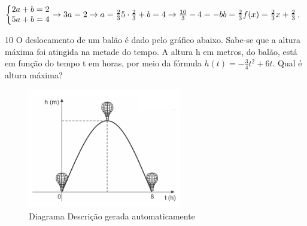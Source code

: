 \begin{escolha}
\begin{boxmedio}
\begin{boxmedio}
{\begin{boxpeq}
\begin{boxpeq}
{\begin{boxpeq}
\begin{boxmedio}
\begin{boxmedio}
\begin{boxpeq}
\begin{boxmedio}
\begin{boxpeq}
\begin{boxpeq}
\begin{boxpeq}
\begin{boxpeq}
\begin{boxmedio}
{\begin{boxmedio}
\begin{boxmedio}
\begin{boxpeq}
\begin{boxmedio}
\begin{boxpeq}
\begin{boxpeq}
\begin{boxpeq}
\begin{escolha}
{\begin{boxmedio}
\begin{boxpeq}
\begin{boxpeq}
\begin{boxpeq}
\begin{boxpeq}
\begin{boxpeq}
\begin{boxmedio}
\begin{boxpeq}
\begin{boxpeq}
\begin{boxpeq}
{\begin{boxpeq}
\begin{boxmedio}
\begin{boxpeq}
\begin{boxpeq}
\begin{boxpeq}
{\begin{boxpeq}
\begin{boxmedio}
{\begin{boxpeq}
\begin{boxpeq}
\begin{boxmedio}
\begin{boxmedio}
\begin{boxpeq}
\begin{boxpeq}
{$\left\{\begin{matrix}
2a + b = 2
\\5a + b = 4 
\end{matrix}\right. \rightarrow 3a = 2 \rightarrow a = \frac{2}{3} \\

5 \cdot \frac{2}{3} + b = 4 \rightarrow \frac{10}{3} - 4 = - b \\

b = \frac{2}{3} \\

f(x) = \frac{2}{3}x + \frac{2}{3}$.

\num{10} O deslocamento de um balão é dado pelo gráfico abaixo. Sabe-se que a
altura máxima foi atingida na metade do tempo. A altura h em metros, do
balão, está em função do tempo t em horas, por meio da fórmula 
$h(t) = - \frac{3}{4} t^2 + 6t$. Qual é altura máxima?

\begin{figure}
\centering
\includegraphics[width=2.62523in,height=2.05851in]{./_SAEB_9_MAT/media/image154.png}
\caption{Diagrama Descrição gerada automaticamente}
\end{figure}

\begin{boxpeq}

\end{boxpeq}}
\end{boxpeq}
\end{boxpeq}
\end{boxmedio}
\end{boxmedio}
\end{boxpeq}
\end{boxpeq}}
\end{boxmedio}
\end{boxpeq}}
\end{boxpeq}
\end{boxpeq}
\end{boxpeq}
\end{boxmedio}
\end{boxpeq}}
\end{boxpeq}
\end{boxpeq}
\end{boxpeq}
\end{boxmedio}
\end{boxpeq}
\end{boxpeq}
\end{boxpeq}
\end{boxpeq}
\end{boxpeq}
\end{boxmedio}}
\end{escolha}
\end{boxpeq}
\end{boxpeq}
\end{boxpeq}
\end{boxmedio}
\end{boxpeq}
\end{boxmedio}
\end{boxmedio}}
\end{boxmedio}
\end{boxpeq}
\end{boxpeq}
\end{boxpeq}
\end{boxpeq}
\end{boxmedio}
\end{boxpeq}
\end{boxmedio}
\end{boxmedio}
\end{boxpeq}}
\end{boxpeq}
\end{boxpeq}}
\end{boxmedio}
\end{boxmedio}
\end{escolha}
